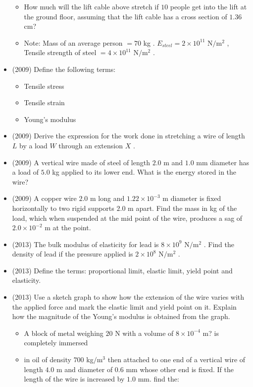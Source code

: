 \documentclass{article}
\begin{document}
\begin{itemize}
\begin{itemize}
\item How much will the lift cable above stretch if $ 10$ people get into the lift at the ground floor, assuming that the lift cable has a cross section of $ 1.36$ cm? 
\item Note: Mass of an average person $ =70$ kg . $ E_{steel}=2 \times 10^{11}$ N$/$m$^{2}$ , Tensile strength of steel $ =4 \times 10^{11}$ N$/$m$^{2}$ .
\end{itemize}
\item (2009)  Define the following terms:
 \begin{itemize}
\item Tensile stress
\item Tensile strain
\item Young’s modulus
\end{itemize}
\item (2009)  Derive the expression for the work done in stretching a wire of length $ L$ by a load $ W$ through an extension $ X$ .
\item (2009)  A vertical wire made of steel of length $ 2.0$ m and $ 1.0$ mm diameter has a load of $ 5.0$ kg applied to its lower end.  What is the energy stored in the wire?
\item (2009)  A copper wire $ 2.0$ m long and $ 1.22 \times 10^{-3}$ m diameter is fixed horizontally to two rigid supports $ 2.0$ m apart.  Find the mass in kg of the load, which when suspended at the mid point of the wire, produces a sag of $ 2.0 \times 10^{-2}$ m at the point.
\item (2013)  The bulk modulus of elasticity for lead is $ 8 \times 10^{9}$ N$/$m$ ^{2}$ . Find the density of lead if the pressure applied is $ 2 \times 10^{8}$ N$/$m$ ^{2}$ . 
\item (2013)  Define the terms: proportional limit, elastic limit, yield point and elasticity.
\item (2013)  Use a sketch graph to show how the extension of the wire varies with the applied force and mark the elastic limit and yield point on it. Explain how the magnitude of the Young's modulus is obtained from the graph.
 \begin{itemize}
\item A block of metal weighing $ 20$ N with a volume of $ 8 \times 10^{-4}$ m? is completely immersed
\item in oil of density $ 700$ kg$/$m$ ^{3}$ then attached to one end of a vertical wire of length $ 4.0$ m and diameter of $ 0.6$ mm whose other end is fixed. If the length of the wire is increased by $ 1.0$ mm. find the:

\end{itemize}
\end{itemize}
\end{document}
